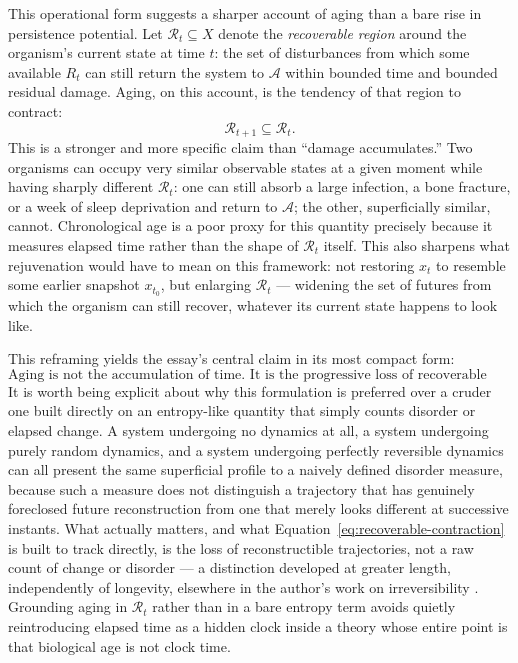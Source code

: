 \documentclass[12pt]{article}
\begin{document}
This operational form suggests a sharper account of aging than a bare rise in persistence potential. Let $\mathcal{R}_t \subseteq X$ denote the \emph{recoverable region} around the organism's current state at time $t$: the set of disturbances from which some available $R_t$ can still return the system to $\mathcal{A}$ within bounded time and bounded residual damage. Aging, on this account, is the tendency of that region to contract:
\begin{equation}
\mathcal{R}_{t+1} \subseteq \mathcal{R}_t.
\label{eq:recoverable-contraction}
\end{equation}
This is a stronger and more specific claim than ``damage accumulates.'' Two organisms can occupy very similar observable states at a given moment while having sharply different $\mathcal{R}_t$: one can still absorb a large infection, a bone fracture, or a week of sleep deprivation and return to $\mathcal{A}$; the other, superficially similar, cannot. Chronological age is a poor proxy for this quantity precisely because it measures elapsed time rather than the shape of $\mathcal{R}_t$ itself. This also sharpens what rejuvenation would have to mean on this framework: not restoring $x_t$ to resemble some earlier snapshot $x_{t_0}$, but enlarging $\mathcal{R}_t$ --- widening the set of futures from which the organism can still recover, whatever its current state happens to look like.

This reframing yields the essay's central claim in its most compact form:
\begin{equation}
\boxed{\text{Aging is not the accumulation of time. It is the progressive loss of recoverable futures.}}
\label{eq:aging-thesis}
\end{equation}
It is worth being explicit about why this formulation is preferred over a cruder one built directly on an entropy-like quantity that simply counts disorder or elapsed change. A system undergoing no dynamics at all, a system undergoing purely random dynamics, and a system undergoing perfectly reversible dynamics can all present the same superficial profile to a naively defined disorder measure, because such a measure does not distinguish a trajectory that has genuinely foreclosed future reconstruction from one that merely looks different at successive instants. What actually matters, and what Equation~\eqref{eq:recoverable-contraction} is built to track directly, is the loss of reconstructible trajectories, not a raw count of change or disorder --- a distinction developed at greater length, independently of longevity, elsewhere in the author's work on irreversibility \cite{flyxion2026worldhood}. Grounding aging in $\mathcal{R}_t$ rather than in a bare entropy term avoids quietly reintroducing elapsed time as a hidden clock inside a theory whose entire point is that biological age is not clock time.
\end{document}
